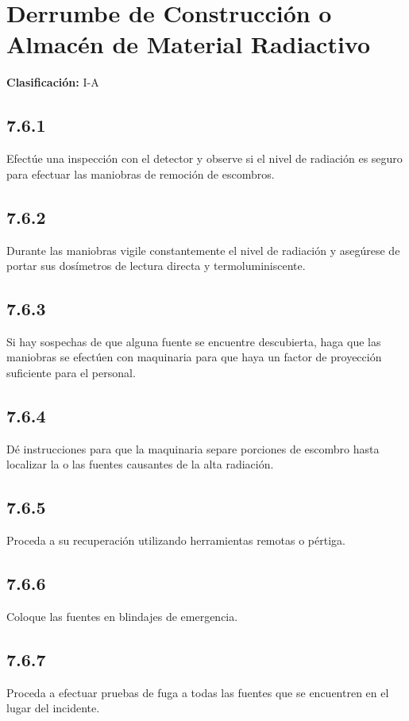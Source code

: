 \section*{Derrumbe de Construcción o Almacén de Material Radiactivo}

\textbf{Clasificación:} I-A

\subsection*{7.6.1}
Efectúe una inspección con el detector y observe si el nivel de radiación es seguro para efectuar las maniobras de remoción de escombros.

\subsection*{7.6.2}
Durante las maniobras vigile constantemente el nivel de radiación y asegúrese de portar sus dosímetros de lectura directa y termoluminiscente.

\subsection*{7.6.3}
Si hay sospechas de que alguna fuente se encuentre descubierta, haga que las maniobras se efectúen con maquinaria para que haya un factor de proyección suficiente para el personal.

\subsection*{7.6.4}
Dé instrucciones para que la maquinaria separe porciones de escombro hasta localizar la o las fuentes causantes de la alta radiación.

\subsection*{7.6.5}
Proceda a su recuperación utilizando herramientas remotas o pértiga.

\subsection*{7.6.6}
Coloque las fuentes en blindajes de emergencia.

\subsection*{7.6.7}
Proceda a efectuar pruebas de fuga a todas las fuentes que se encuentren en el lugar del incidente.